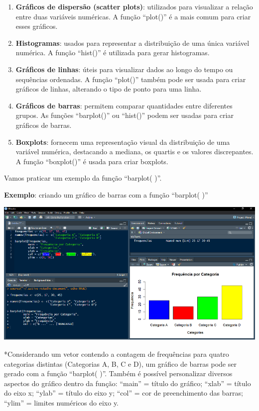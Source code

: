 \documentclass[
]{book}
\begin{document}
\begin{enumerate}
\def\labelenumi{\arabic{enumi}.}
\item
  \textbf{Gráficos de dispersão (scatter plots)}: utilizados para visualizar a relação entre duas variáveis numéricas. A função ``plot()'' é a mais comum para criar esses gráficos.
\item
  \textbf{Histogramas}: usados para representar a distribuição de uma única variável numérica. A função ``hist()'' é utilizada para gerar histogramas.
\item
  \textbf{Gráficos de linhas}: úteis para visualizar dados ao longo do tempo ou sequências ordenadas. A função ``plot()'' também pode ser usada para criar gráficos de linhas, alterando o tipo de ponto para uma linha.
\item
  \textbf{Gráficos de barras}: permitem comparar quantidades entre diferentes grupos. As funções ``barplot()'' ou ``hist()'' podem ser usadas para criar gráficos de barras.
\item
  \textbf{Boxplots}: fornecem uma representação visual da distribuição de uma variável numérica, destacando a mediana, os quartis e os valores discrepantes. A função ``boxplot()'' é usada para criar boxplots.
\end{enumerate}

Vamos praticar um exemplo da função ``barplot( )''.

\textbf{Exemplo}: criando um gráfico de barras com a função ``barplot( )''

\includegraphics{images/clipboard-18805364.png}

*Considerando um vetor contendo a contagem de frequências para quatro categorias distintas (Categorias A, B, C e D), um gráfico de barras pode ser gerado com a função ``barplot( )''. Também é possível personalizar diversos aspectos do gráfico dentro da função: ``main'' = título do gráfico; ``xlab'' = título do eixo x; ``ylab'' = título do eixo y; ``col'' = cor de preenchimento das barras; ``ylim'' = limites numéricos do eixo y.
\end{document}
